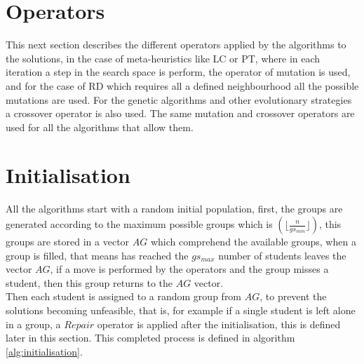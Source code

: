 
\section{Operators}

This next section describes the different operators applied by the algorithms to the solutions, in the case of meta-heuristics like LC or PT, where in each iteration a step in the search space is perform, the operator of mutation is used, and for the case of RD which requires all a defined neighbourhood all the possible mutations are used. For the genetic algorithms and other evolutionary strategies a crossover operator is also used. The same mutation and crossover operators are used for all the algorithms that allow them.

\section{Initialisation}

All the algorithms start with a random initial population, first, the groups are generated according to the maximum possible groups which is $(\lfloor\frac{n}{gs_{min}}\rfloor)$, this groups are stored in a vector $AG$ which comprehend the available groups, when a group is filled, that means has reached the $gs_{max}$ number of students leaves the vector $AG$, if a move is performed by the operators and the group misses a student, then this group returns to the $AG$ vector.\\

Then each student is assigned to a random group from $AG$, to prevent the solutions becoming unfeasible, that is, for example if a single student is left alone in a group, a $Repair$ operator is applied after the initialisation, this is defined later in this section. This completed process is defined in algorithm \ref{alg:initialisation}.

